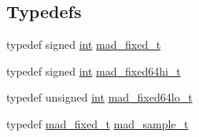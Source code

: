 \subsection*{Typedefs}
\begin{DoxyCompactItemize}
\item 
typedef signed \hyperlink{xmltok_8h_a5a0d4a5641ce434f1d23533f2b2e6653}{int} \hyperlink{mac_2config_2i386_2lib-src_2libmad_2mad_8h_a5086b0f25866d1a5d2511e1c9824dfe6}{mad\+\_\+fixed\+\_\+t}
\item 
typedef signed \hyperlink{xmltok_8h_a5a0d4a5641ce434f1d23533f2b2e6653}{int} \hyperlink{mac_2config_2i386_2lib-src_2libmad_2mad_8h_ae47027c34651060a730a7d8266c45307}{mad\+\_\+fixed64hi\+\_\+t}
\item 
typedef unsigned \hyperlink{xmltok_8h_a5a0d4a5641ce434f1d23533f2b2e6653}{int} \hyperlink{mac_2config_2i386_2lib-src_2libmad_2mad_8h_a739f4d59695c7a51dfeccc623d0fda80}{mad\+\_\+fixed64lo\+\_\+t}
\item 
typedef \hyperlink{libmad_2fixed_8h_a8a4b50d6d4d6827b7a8c871db1cbfd78}{mad\+\_\+fixed\+\_\+t} \hyperlink{mac_2config_2i386_2lib-src_2libmad_2mad_8h_a66d26474ecf238cb00458050afb95051}{mad\+\_\+sample\+\_\+t}
\end{DoxyCompactItemize}
